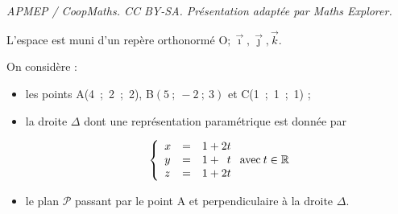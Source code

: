 \documentclass[10pt]{article}
\providecommand{\R}{\mathbb{R}}
\providecommand{\Oijk}{\(\mathrm{O};\vec{\imath},\vec{\jmath},\vec{k}\)}
\begin{document}
\noindent\textit{APMEP / CoopMaths. CC BY-SA. Présentation adaptée par Maths Explorer.}\par\medskip
L'espace est muni d'un repère orthonormé \Oijk.

On considère :

\begin{itemize}[label=$\bullet~$]
\item les points A(4~;~2~;~2), B$(5~;~-2~;~3)$ et C(1~;~1~;~1) ;
\item la droite $\Delta$ dont une représentation paramétrique est donnée par

\[\left\{\begin{array}{l c l}
x &=& 1 + 2t\\
y &=&1+ \phantom{2}t\\
z &=& 1 +2t\\
\end{array}\right. \text{avec}\: t \in \R\]
	
	\item le plan $\mathcal{P}$ passant par le point A et perpendiculaire à la droite $\Delta$.
	\end{itemize}
	
	\medskip
	
\end{document}
